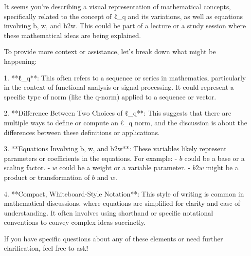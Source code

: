 It seems you're describing a visual representation of mathematical concepts, specifically related to the concept of ℓ_q and its variations, as well as equations involving b, w, and b2w. This could be part of a lecture or a study session where these mathematical ideas are being explained.

To provide more context or assistance, let's break down what might be happening:

1. **ℓ_q**: This often refers to a sequence or series in mathematics, particularly in the context of functional analysis or signal processing. It could represent a specific type of norm (like the q-norm) applied to a sequence or vector.

2. **Difference Between Two Choices of ℓ_q**: This suggests that there are multiple ways to define or compute an ℓ_q norm, and the discussion is about the differences between these definitions or applications.

3. **Equations Involving b, w, and b2w**: These variables likely represent parameters or coefficients in the equations. For example:
   - \( b \) could be a base or a scaling factor.
   - \( w \) could be a weight or a variable parameter.
   - \( b2w \) might be a product or transformation of \( b \) and \( w \).

4. **Compact, Whiteboard-Style Notation**: This style of writing is common in mathematical discussions, where equations are simplified for clarity and ease of understanding. It often involves using shorthand or specific notational conventions to convey complex ideas succinctly.

If you have specific questions about any of these elements or need further clarification, feel free to ask!